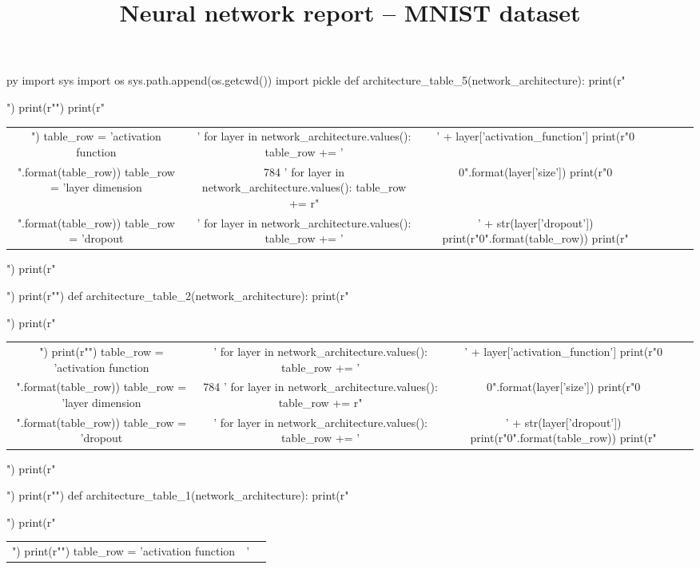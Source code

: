 \documentclass[11pt]{article}
\title{\vspace{-8ex}Neural network report -- MNIST dataset}
\date{\vspace{-12ex}}
\begin{document}
\maketitle
\begin{pythontexcustomcode}{py}
import sys
import os
sys.path.append(os.getcwd())
import pickle
def architecture_table_5(network_architecture):
    print(r"\begin{table}[H]")
    print(r"\centering")
    print(r"\begin{tabular}{cc|c|c|c|c|c}")
    table_row = 'activation function & '
    for layer in network_architecture.values():
        table_row += ' & ' + layer['activation_function']
    print(r"{0} \\".format(table_row))
    table_row = 'layer dimension & \LARGE 784 '
    for layer in network_architecture.values():
        table_row += r"& \LARGE {0}".format(layer['size'])
    print(r"{0} \\".format(table_row))
    table_row = 'dropout & '
    for layer in network_architecture.values():
        table_row += '& ' + str(layer['dropout'])
    print(r"{0}".format(table_row))
    print(r"\end{tabular}")
    print(r"\end{table}")
    print(r"")
def architecture_table_2(network_architecture):
    print(r"\begin{table}[H]")
    print(r"\begin{tabular}{cc|c|c}")
    print(r"\centering")
    table_row = 'activation function & '
    for layer in network_architecture.values():
        table_row += ' & ' + layer['activation_function']
    print(r"{0} \\".format(table_row))
    table_row = 'layer dimension & \LARGE 784 '
    for layer in network_architecture.values():
        table_row += r"& \LARGE {0}".format(layer['size'])
    print(r"{0} \\".format(table_row))
    table_row = 'dropout & '
    for layer in network_architecture.values():
        table_row += '& ' + str(layer['dropout'])
    print(r"{0}".format(table_row))
    print(r"\end{tabular}")
    print(r"\end{table}")
    print(r"")
def architecture_table_1(network_architecture):
    print(r"\begin{table}[H]")
    print(r"\begin{tabular}{cc|c}")
    print(r"\centering")
    table_row = 'activation function & '

\end{tabular}
\end{table}
\end{pythontexcustomcode}
\end{document}
